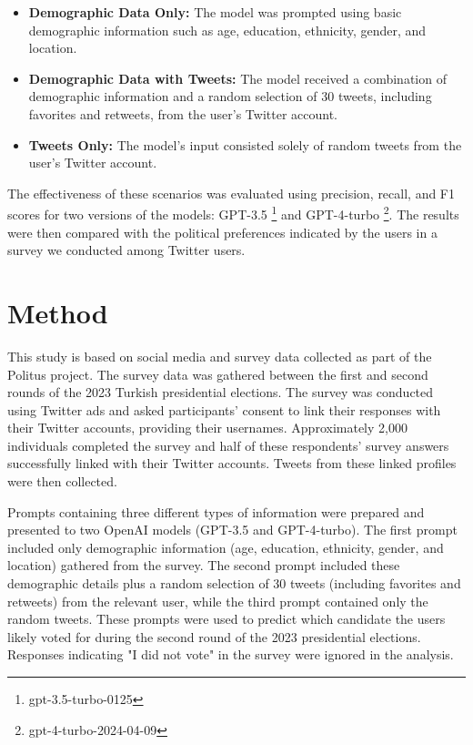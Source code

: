 \documentclass[sigconf,natbib=false]{acmart}
\begin{document}
\begin{itemize}
    \item \textbf{Demographic Data Only:} The model was prompted using basic demographic information such as age, education, ethnicity, gender, and location.
    \item \textbf{Demographic Data with Tweets:} The model received a combination of demographic information and a random selection of 30 tweets, including favorites and retweets, from the user's Twitter account.
    \item \textbf{Tweets Only:} The model's input consisted solely of random tweets from the user's Twitter account.
\end{itemize}

The effectiveness of these scenarios was evaluated using precision, recall, and F1 scores for two versions of the models: GPT-3.5 \footnote{gpt-3.5-turbo-0125} and GPT-4-turbo \footnote{gpt-4-turbo-2024-04-09}. The results were then compared with the political preferences indicated by the users in a survey we conducted among Twitter users.

\section{Method}
This study is based on social media and survey data collected as part of the Politus project. The survey data was gathered between the first and second rounds of the 2023 Turkish presidential elections. The survey was conducted using Twitter ads and asked participants' consent to link their responses with their Twitter accounts, providing their usernames. Approximately 2,000 individuals completed the survey and half of these respondents' survey answers successfully linked with their Twitter accounts. Tweets from these linked profiles were then collected.

Prompts containing three different types of information were prepared and presented to two OpenAI models (GPT-3.5 and GPT-4-turbo). The first prompt included only demographic information (age, education, ethnicity, gender, and location) gathered from the survey. The second prompt included these demographic details plus a random selection of 30 tweets (including favorites and retweets) from the relevant user, while the third prompt contained only the random tweets. These prompts were used to predict which candidate the users likely voted for during the second round of the 2023 presidential elections. Responses indicating "I did not vote" in the survey were ignored in the analysis.
\end{document}
